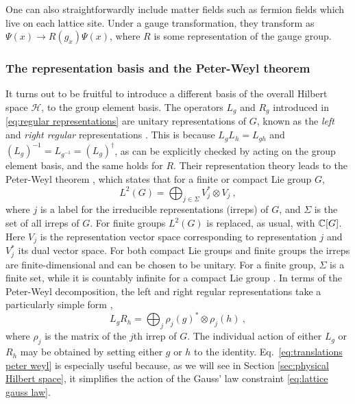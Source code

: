One can also straightforwardly include matter fields such as fermion fields which live on each lattice site.
Under a gauge transformation, they transform as $\Psi(x) \to R(g_x) \Psi(x)$, where $R$ is some representation of the gauge group.



\subsubsection{The representation basis and the Peter-Weyl theorem}\label{sec:representation basis}

It turns out to be fruitful to introduce a different basis of the overall Hilbert space $\mathcal{H}$,  to the group element basis.
The operators $L_g$ and $R_g$ introduced in \eqref{eq:regular representations} are unitary representations of $G$, known as the \textit{left} and \textit{right regular} representations \cite{serre1967representations, knapp1996lie}.
This is because $L_g L_h = L_{gh}$ and $(L_g)^{-1}=L_{g^{-1}}=(L_g)^\dagger$, as can be explicitly checked by acting on the group element basis, and the same holds for $R$.
Their representation theory leads to the Peter-Weyl theorem \cite{knapp1996lie, milstead2018qyangmills, marianithesis}, which states that for a finite or compact Lie group $G$,
\begin{equation}
    \label{eq:peterweyl}
    L^2(G) = \bigoplus_{j \in \Sigma} V_j^* \otimes V_j \ ,
\end{equation}
where $j$ is a label for the irreducible representations (irreps) of $G$, and $\Sigma$ is the set of all irreps of $G$.
For finite groups $L^2(G)$ is replaced, as usual, with $\mathbb{C}[G]$.
Here $V_j$ is the representation vector space corresponding to representation $j$ and $V_j^*$ its dual vector space.
For both compact Lie groups and finite groups the irreps are finite-dimensional and can be chosen to be unitary.
For a finite group, $\Sigma$ is a finite set, while it is countably infinite for a compact Lie group \cite{knapp1996lie, serre1967representations}.
In terms of the Peter-Weyl decomposition, the left and right regular representations take a particularly simple form \cite{marianithesis},
\begin{equation}
    \label{eq:translations peter weyl}
    L_g R_h = \bigoplus_j \rho_j(g)^* \otimes \rho_j(h) \ ,
\end{equation}
where $\rho_j$ is the matrix of the $j$th irrep of $G$.
The individual action of either $L_g$ or $R_h$ may be obtained by setting either $g$ or $h$ to the identity.
Eq.~\eqref{eq:translations peter weyl} is especially useful because, as we will see in Section \ref{sec:physical Hilbert space}, it simplifies the action of the Gauss' law constraint \eqref{eq:lattice gauss law}.

